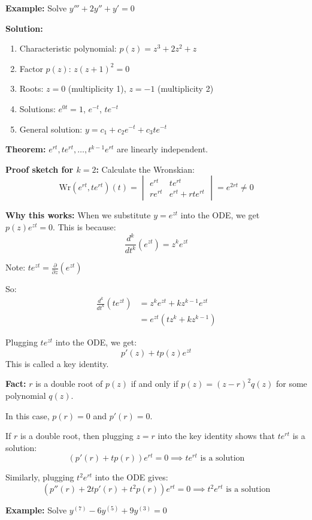 \documentclass{article}
\begin{document}
\textbf{Example:} Solve $y''' + 2y'' + y' = 0$

\textbf{Solution:}
\begin{enumerate}
    \item Characteristic polynomial: $p(z) = z^3 + 2z^2 + z$
    \item Factor $p(z)$: $z(z+1)^2 = 0$
    \item Roots: $z = 0$ (multiplicity 1), $z = -1$ (multiplicity 2)
    \item Solutions: $e^{0t} = 1$, $e^{-t}$, $te^{-t}$
    \item General solution: $y = c_1 + c_2e^{-t} + c_3te^{-t}$
\end{enumerate}

\textbf{Theorem:} $e^{rt}, te^{rt}, \ldots, t^{k-1}e^{rt}$ are linearly independent.

\textbf{Proof sketch for $k=2$:}
Calculate the Wronskian:
\[
\text{Wr}(e^{rt}, te^{rt})(t) = \begin{vmatrix}
e^{rt} & te^{rt} \\
re^{rt} & e^{rt} + rte^{rt}
\end{vmatrix} = e^{2rt} \neq 0
\]

\textbf{Why this works:}
When we substitute $y = e^{zt}$ into the ODE, we get $p(z)e^{zt} = 0$.
This is because:
\[
\frac{d^k}{dt^k} (e^{zt}) = z^k e^{zt}
\]

Note: $te^{zt} = \frac{\partial}{\partial z}(e^{zt})$

So:
\begin{align*}
\frac{d^k}{dt^k}(te^{zt}) &= z^k e^{zt} + k z^{k-1} e^{zt} \\
&= e^{zt}(tz^k + k z^{k-1})
\end{align*}

Plugging $te^{zt}$ into the ODE, we get:
\[
p'(z) + tp(z)e^{zt}
\]
This is called a key identity.

\textbf{Fact:} $r$ is a double root of $p(z)$ if and only if $p(z) = (z-r)^2 q(z)$ for some polynomial $q(z)$.

In this case, $p(r) = 0$ and $p'(r) = 0$.

If $r$ is a double root, then plugging $z = r$ into the key identity shows that $te^{rt}$ is a solution:
\[
(p'(r) + tp(r))e^{rt} = 0 \implies te^{rt} \text{ is a solution}
\]

Similarly, plugging $t^2e^{rt}$ into the ODE gives:
\[
(p''(r) + 2tp'(r) + t^2p(r))e^{rt} = 0 \implies t^2e^{rt} \text{ is a solution}
\]

\textbf{Example:} Solve $y^{(7)} - 6y^{(5)} + 9y^{(3)} = 0$
\end{document}
